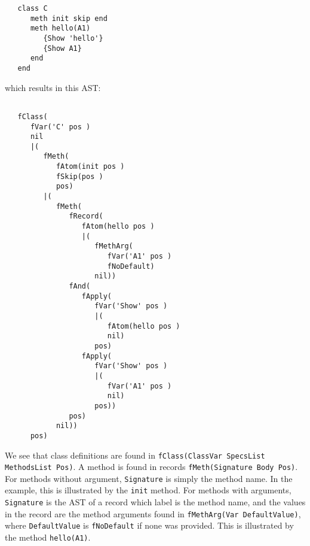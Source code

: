 \documentclass[a4paper]{memoir}
\begin{document}
\begin{lstlisting}
   class C
      meth init skip end
      meth hello(A1)
         {Show 'hello'}
         {Show A1}
      end
   end
\end{lstlisting}
which results in this AST:
\begin{lstlisting}

   fClass(
      fVar('C' pos )
      nil
      |(
         fMeth(
            fAtom(init pos )
            fSkip(pos )
            pos)
         |(
            fMeth(
               fRecord(
                  fAtom(hello pos )
                  |(
                     fMethArg(
                        fVar('A1' pos )
                        fNoDefault)
                     nil))
               fAnd(
                  fApply(
                     fVar('Show' pos )
                     |(
                        fAtom(hello pos )
                        nil)
                     pos)
                  fApply(
                     fVar('Show' pos )
                     |(
                        fVar('A1' pos )
                        nil)
                     pos))
               pos)
            nil))
      pos)
\end{lstlisting}

We see that class definitions are found in 
\lstinline!fClass(ClassVar SpecsList MethodsList Pos)!.
A method is found in records \lstinline!fMeth(Signature Body Pos)!.
For methods without argument, \lstinline!Signature! is simply the method name.
In the example, this is illustrated by the \lstinline!init! method.
For methods with arguments, \lstinline!Signature! is the AST of a record which label is the method name, and the
values in the record are the method arguments found in 
\lstinline!fMethArg(Var DefaultValue)!, where \lstinline!DefaultValue! is
\lstinline!fNoDefault! if none was provided.
This is illustrated by the method \lstinline!hello(A1)!.
\end{document}
